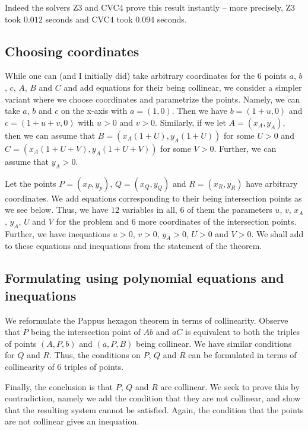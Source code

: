\documentclass{amsart}
\theoremstyle{plain}
\theoremstyle{definition}
\theoremstyle{remark}
\begin{document}
Indeed the solvers Z3 and CVC4 prove this result instantly -- more
precisely, Z3 took \(0.012\) seconds and CVC4 took \(0.094\) seconds.

\hypertarget{choosing-coordinates}{%
	\subsection{Choosing coordinates}\label{choosing-coordinates}}

While one can (and I initially did) take arbitrary coordinates for the
\(6\) points \(a\), \(b\), \(c\), \(A\), \(B\) and \(C\) and add
equations for their being collinear, we consider a simpler variant where
we choose coordinates and parametrize the points. Namely, we can take
\(a\), \(b\) and \(c\) on the x-axis with \(a = (1, 0)\). Then we have
\(b = (1 + u, 0)\) and \(c = (1 + u + v, 0)\) with \(u>0\) and \(v>0\).
Similarly, if we let \(A = (x_A, y_A)\), then we can assume that
\(B = (x_A(1+ U), y_A(1 + U))\) for some \(U > 0\) and
\(C = (x_A(1+ U + V), y_A(1 + U + V))\) for some \(V > 0\). Further, we
can assume that \(y_A > 0\).

Let the points \(P= (x_P, y_p)\), \(Q = (x_Q, y_Q)\) and
\(R= (x_R, y_R)\) have arbitrary coordinates. We add equations
corresponding to their being intersection points as we see below. Thus,
we have \(12\) variables in all, \(6\) of them the parameters \(u\),
\(v\), \(x_A\), \(y_A\), \(U\) and \(V\) for the problem and \(6\) more
coordinates of the intersection points. Further, we have inequations
\(u >0\), \(v >0\), \(y_A >0\), \(U > 0\) and \(V >0\). We shall add to
these equations and inequations from the statement of the theorem.

\hypertarget{formulating-using-polynomial-equations-and-inequations}{%
	\subsection{Formulating using polynomial equations and
		inequations}\label{formulating-using-polynomial-equations-and-inequations}}

We reformulate the Pappus hexagon theorem in terms of collinearity.
Observe that \(P\) being the intersection point of \(Ab\) and \(aC\) is
equivalent to both the triples of points \((A, P, b)\) and \((a, P, B)\)
being collinear. We have similar conditions for \(Q\) and \(R\). Thus,
the conditions on \(P\), \(Q\) and \(R\) can be formulated in terms of
collinearity of \(6\) triples of points.

Finally, the conclusion is that \(P\), \(Q\) and \(R\) are collinear. We
seek to prove this by contradiction, namely we add the condition that
they are not collinear, and show that the resulting system cannot be
satisfied. Again, the condition that the points are not collinear gives
an inequation.
\end{document}
